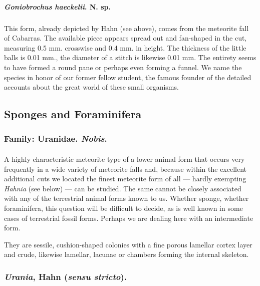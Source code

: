 \documentclass[a4paper, 12pt, oneside]{article}
\begin{document}
\paragraph{\emph{Goniobrochus haeckelii}. N. sp.}
\subparagraph{}
This form, already depicted by Hahn (see above), comes from the meteorite fall of Cabarras. The available piece appears spread out and fan-shaped in the cut, measuring 0.5 mm. crosswise and 0.4 mm. in height. The thickness of the little balls is 0.01 mm., the diameter of a stitch is likewise 0.01 mm. The entirety seems to have formed a round pane or perhaps even forming a funnel. We name the species in honor of our former fellow student, the famous founder of the detailed accounts about the great world of these small organisms.
\clearpage
\subsection{Sponges and Foraminifera}
\subsubsection*{Family: Uranidae. \emph{Nobis}.}
\paragraph*{}
A highly characteristic meteorite type of a lower animal form that occurs very frequently in a wide variety of meteorite falls and, because within the excellent additional cuts we located the finest meteorite form of all --- hardly exempting \emph{Hahnia} (see below) --- can be studied. The same cannot be closely associated with any of the terrestrial animal forms known to us. Whether sponge, whether foraminifera, this question will be difficult to decide, as is well known in some cases of terrestrial fossil forms. Perhaps we are dealing here with an intermediate form.

They are sessile, cushion-shaped colonies with a fine porous lamellar cortex layer and crude, likewise lamellar, lacunae or chambers forming the internal skeleton.
\subsubsection{\emph{Urania}, Hahn (\emph{sensu stricto}).}
\end{document}
